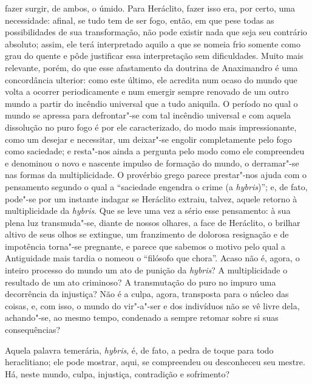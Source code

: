 fazer surgir, de ambos, o úmido. Para Heráclito, fazer isso era, por
certo, uma necessidade: afinal, se tudo tem de ser fogo, então, em que
pese todas as possibilidades de sua transformação, não pode existir
nada que seja seu contrário absoluto; assim, ele terá interpretado
aquilo a que se nomeia frio somente como grau do quente e pôde
justificar essa interpretação sem dificuldades. Muito mais relevante,
porém, do que esse afastamento da doutrina de Anaximandro é uma
concordância ulterior: como este último, ele acredita num ocaso do mundo
que volta a ocorrer periodicamente e num emergir sempre renovado de um
outro mundo a partir do incêndio universal que a tudo aniquila. O
período no qual o mundo se apressa para defrontar"-se com tal incêndio
universal e com aquela dissolução no puro fogo é por ele caracterizado,
do modo mais impressionante, como um desejar e necessitar, um deixar"-se
engolir completamente pelo fogo como saciedade; e resta"-nos ainda a
pergunta pelo modo como ele compreendeu e denominou o novo e nascente
impulso de formação do mundo, o derramar"-se nas formas da
multiplicidade. O provérbio grego parece prestar"-nos ajuda com o
pensamento segundo o qual a ``saciedade engendra o crime
(a \textit{hybris})''; e, de fato, pode"-se por um instante
indagar se Heráclito extraiu, talvez, aquele retorno à multiplicidade
da \textit{hybris}. Que se leve uma vez a sério esse pensamento: à sua
plena luz transmuda"-se, diante de nossos olhares, a face de Heráclito,
o brilhar altivo de seus olhos se extingue, um franzimento de dolorosa
resignação e de impotência torna"-se pregnante, e parece que sabemos o
motivo pelo qual a Antiguidade mais tardia o nomeou o
``filósofo que chora''. Acaso não é, agora, o
inteiro processo do mundo um ato de punição da \textit{hybris}? A
multiplicidade o resultado de um ato criminoso? A transmutação do puro
no impuro uma decorrência da injustiça? Não é a culpa, agora,
transposta para o núcleo das coisas, e, com isso, o mundo do vir"-a"-ser
e dos indivíduos não se vê livre dela, achando"-se, ao mesmo
tempo, condenado a sempre retomar sobre si suas consequências?

\sectionitem

Aquela palavra temerária, \textit{hybris}, é, de fato, a pedra de toque
para todo heraclitiano; ele pode mostrar, aqui, se compreendeu ou
desconheceu seu mestre. Há, neste mundo, culpa, injustiça, contradição e sofrimento?

